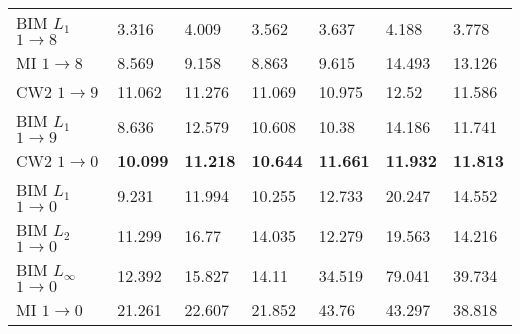\documentclass[12pt]{article}
\begin{document}
\begin{table}[t]
\begin{center}
{\begin{tabular}{|l|lll|lll|}
BIM $L_1$  $1\to 8$&3.316&	4.009&	3.562&	3.637&	4.188&	3.778 \\
MI  $1\to 8$&8.569&	9.158&	8.863&	9.615&	14.493&	13.126\\\hline
CW2 $1\to 9$&11.062&	11.276&	11.069&	10.975&	12.52&	11.586 \\
BIM $L_1$  $1\to 9$& 8.636&	12.579&	10.608&	10.38&	14.186&	11.741\\\hline
CW2 $1\to 0$ &{\bf 10.099}&{\bf	11.218}&{\bf 10.644}&{\bf 11.661}
&{\bf  11.932}&{\bf 11.813} \\
BIM $L_1$ $1\to 0$&9.231&	11.994&	10.255&	12.733&	20.247&	14.552 \\
BIM $L_2$ $1\to 0$&11.299&	16.77&	14.035&	12.279&	19.563&	14.216 \\
BIM $L_{\infty}$ $1\to 0$&12.392&	15.827&	14.11&	34.519&	79.041&	39.734  \\
MI $1\to 0$&21.261&	22.607&	21.852&	43.76&	43.297&	38.818\\
\hline
\end{tabular} }
\end{center}
\end{table}
\end{document}
